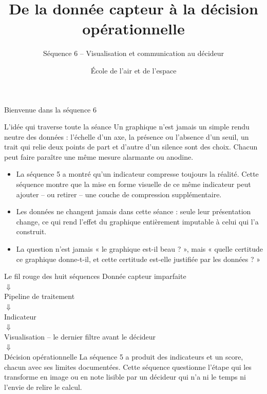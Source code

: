 \documentclass[aspectratio=169]{beamer}
\title{De la donnée capteur à la décision opérationnelle}
\subtitle{Séquence 6 -- Visualisation et communication au décideur}
\author{École de l'air et de l'espace}
\date{}
\begin{document}
\begin{frame}
  \titlepage
\end{frame}

\begin{frame}{Bienvenue dans la séquence 6}
  \begin{block}{L'idée qui traverse toute la séance}
    Un graphique n'est jamais un simple rendu neutre des données : l'échelle d'un axe, la présence ou l'absence d'un seuil, un trait qui relie deux points de part et d'autre d'un silence sont des choix. Chacun peut faire paraître une même mesure alarmante ou anodine.
  \end{block}
  \begin{itemize}
    \item La séquence 5 a montré qu'un indicateur compresse toujours la réalité. Cette séquence montre que la mise en forme visuelle de ce même indicateur peut ajouter -- ou retirer -- une couche de compression supplémentaire.
    \item Les données ne changent jamais dans cette séance : seule leur présentation change, ce qui rend l'effet du graphique entièrement imputable à celui qui l'a construit.
    \item La question n'est jamais « le graphique est-il beau ? », mais « quelle certitude ce graphique donne-t-il, et cette certitude est-elle justifiée par les données ? »
  \end{itemize}
\end{frame}

\begin{frame}{Le fil rouge des huit séquences}
  \centering
  \Large Donnée capteur imparfaite\\[2mm]
  $\Downarrow$\\[-1mm]
  Pipeline de traitement\\[-1mm]
  $\Downarrow$\\[-1mm]
  Indicateur\\[-1mm]
  $\Downarrow$\\[-1mm]
  Visualisation \alert{\normalsize -- le dernier filtre avant le décideur}\\[-1mm]
  $\Downarrow$\\[-1mm]
  Décision opérationnelle
  \vfill
  \normalsize La séquence 5 a produit des indicateurs et un score, chacun avec ses limites documentées. Cette séquence questionne l'étape qui les transforme en image ou en note lisible par un décideur qui n'a ni le temps ni l'envie de relire le calcul.
\end{frame}
\end{document}
